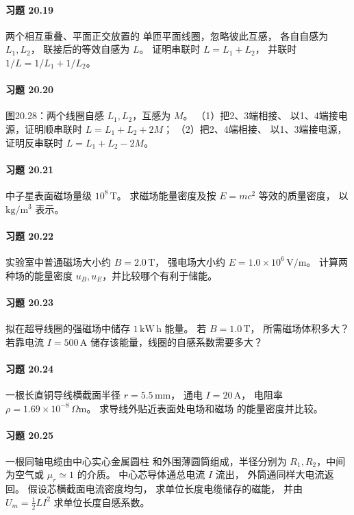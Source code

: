 \paragraph{习题 20.19}
两个相互重叠、平面正交放置的
单匝平面线圈，忽略彼此互感，
各自自感为 \(L_1,L_2\)，
联接后的等效自感为 \(L\)。
证明串联时
\(L=L_1+L_2\)，
并联时
\(1/L=1/L_1+1/L_2\)。

\paragraph{习题 20.20}
图20.28：两个线圈自感
\(L_1,L_2\)，互感为 \(M\)。
（1）把2、3端相接、
以1、4端接电源，证明顺串联时
\(L=L_1+L_2+2M\)；
（2）把2、4端相接、
以1、3端接电源，证明反串联时
\(L=L_1+L_2-2M\)。

\paragraph{习题 20.21}
中子星表面磁场量级
\(10^8\,\mathrm T\)。
求磁场能量密度及按
\(E=mc^2\) 等效的质量密度，
以 \(\mathrm{kg/m^3}\) 表示。

\paragraph{习题 20.22}
实验室中普通磁场大小约
\(B=2.0\,\mathrm T\)，
强电场大小约
\(E=1.0\times10^6\,\mathrm{V/m}\)。
计算两种场的能量密度
\(u_B,u_E\)，并比较哪个有利于储能。

\paragraph{习题 20.23}
拟在超导线圈的强磁场中储存
\(1\,\mathrm{kW\,h}\) 能量。
若 \(B=1.0\,\mathrm T\)，
所需磁场体积多大？
若靠电流 \(I=500\,\mathrm A\)
储存该能量，线圈的自感系数需要多大？

\paragraph{习题 20.24}
一根长直铜导线横截面半径
\(r=5.5\,\mathrm{mm}\)，
通电 \(I=20\,\mathrm A\)，
电阻率
\(\rho=1.69\times10^{-8}\,\Omega\mathrm m\)。
求导线外贴近表面处电场和磁场
的能量密度并比较。

\paragraph{习题 20.25}
一根同轴电缆由中心实心金属圆柱
和外围薄圆筒组成，半径分别为
\(R_1,R_2\)，中间为空气或
\(\mu_r\simeq1\) 的介质。
中心芯导体通总电流 \(I\) 流出，
外筒通同样大电流返回。
假设芯横截面电流密度均匀，
求单位长度电缆储存的磁能，
并由 \(U_m=\frac12L I^2\)
求单位长度自感系数。

